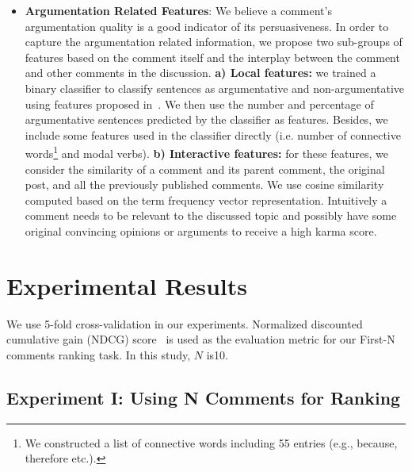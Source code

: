 \documentclass[11pt]{article}
\begin{document}
\begin{itemize}[leftmargin=.15in]
	\item \textbf{Argumentation Related Features}: We believe a comment's argumentation quality is a good indicator of its persuasiveness. In order to capture the argumentation related information, we propose two sub-groups of features based on the comment itself and the interplay between the comment and other comments in the discussion. \textbf{a) Local features:} we trained a binary classifier to classify sentences as argumentative and non-argumentative using features proposed in~\cite{stab2014identifying}. We then use the number and percentage of argumentative sentences predicted by the classifier as features. Besides, we include some features used in the classifier directly (i.e. number of connective words\footnote{We constructed a list of connective words including 55 entries (e.g., because, therefore etc.). } and modal verbs). \textbf{b) Interactive features:} for these features, we consider the similarity of a comment and its parent comment, the original post, and all the previously published comments. We use cosine similarity computed based on the term frequency vector representation. Intuitively a comment needs to be relevant to the discussed topic and possibly have some original convincing opinions or arguments to receive a high karma score. 
	
	

\end{itemize}

\section{Experimental Results}

We use 5-fold cross-validation in our experiments. Normalized discounted cumulative gain (NDCG) score~\cite{jarvelin2000ir} is used as the evaluation metric for our First-N comments ranking task. 
In this study, $N$ is10.

\subsection{Experiment I: Using N Comments for Ranking}
\end{document}
